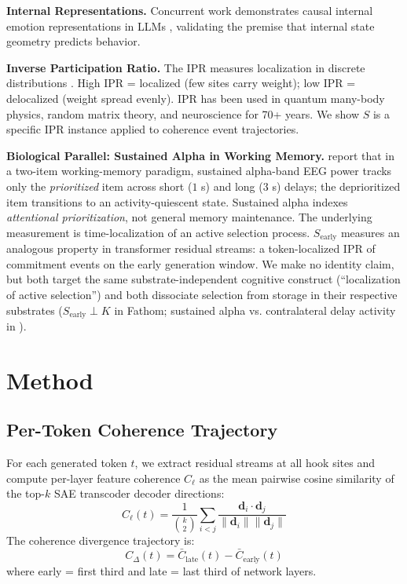 \documentclass{article}
\begin{document}
\textbf{Internal Representations.}
Concurrent work demonstrates causal internal emotion representations
in LLMs \citep{anthropic2026emotion}, validating the premise that
internal state geometry predicts behavior.

\textbf{Inverse Participation Ratio.}
The IPR measures localization in discrete distributions
\citep{anderson1958absence}. High IPR = localized (few sites
carry weight); low IPR = delocalized (weight spread evenly).
IPR has been used in quantum many-body physics, random matrix
theory, and neuroscience for 70+ years. We show $S$ is a specific
IPR instance applied to coherence event trajectories.

\textbf{Biological Parallel: Sustained Alpha in Working Memory.}
\citet{weng2026sustained} report that in a two-item working-memory
paradigm, sustained alpha-band EEG power tracks only the
\textit{prioritized} item across short ($1$ s) and long ($3$ s) delays;
the deprioritized item transitions to an activity-quiescent state.
Sustained alpha indexes \textit{attentional prioritization}, not
general memory maintenance. The underlying measurement is
time-localization of an active selection process. $S_\text{early}$
measures an analogous property in transformer residual streams: a
token-localized IPR of commitment events on the early generation
window. We make no identity claim, but both target the same
substrate-independent cognitive construct (``localization of active
selection'') and both dissociate selection from storage in their
respective substrates ($S_\text{early}\perp K$ in Fathom; sustained
alpha vs. contralateral delay activity in \citealt{weng2026sustained}).

\section{Method}

\subsection{Per-Token Coherence Trajectory}

For each generated token $t$, we extract residual streams at all
hook sites and compute per-layer feature coherence $C_\ell$ as the
mean pairwise cosine similarity of the top-$k$ SAE transcoder decoder
directions:
\begin{equation}
C_\ell(t) = \frac{1}{\binom{k}{2}} \sum_{i<j}
\frac{\mathbf{d}_i \cdot \mathbf{d}_j}{\|\mathbf{d}_i\| \|\mathbf{d}_j\|}
\end{equation}
The coherence divergence trajectory is:
\begin{equation}
C_\Delta(t) = \bar{C}_\text{late}(t) - \bar{C}_\text{early}(t)
\end{equation}
where early = first third and late = last third of network layers.
\end{document}
